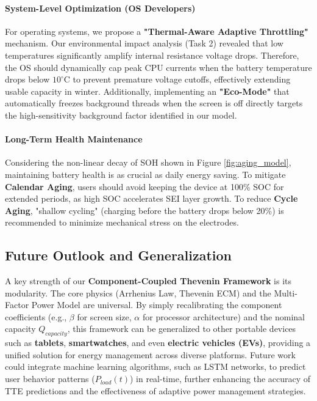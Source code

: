\documentclass{mcmthesis}
\newcommand{\Qcap}{Q_{capacity}}
\begin{document}
\paragraph{System-Level Optimization (OS Developers)}
For operating systems, we propose a \textbf{"Thermal-Aware Adaptive Throttling"} mechanism. Our environmental impact analysis (Task 2) revealed that low temperatures significantly amplify internal resistance voltage drops. Therefore, the OS should dynamically cap peak CPU currents when the battery temperature drops below $10^\circ$C to prevent premature voltage cutoffs, effectively extending usable capacity in winter. Additionally, implementing an \textbf{"Eco-Mode"} that automatically freezes background threads when the screen is off directly targets the high-sensitivity background factor identified in our model.

\paragraph{Long-Term Health Maintenance}
Considering the non-linear decay of SOH shown in Figure \ref{fig:aging_model}, maintaining battery health is as crucial as daily energy saving. To mitigate \textbf{Calendar Aging}, users should avoid keeping the device at 100\% SOC for extended periods, as high SOC accelerates SEI layer growth. To reduce \textbf{Cycle Aging}, "shallow cycling" (charging before the battery drops below 20\%) is recommended to minimize mechanical stress on the electrodes.

\subsection{Future Outlook and Generalization}
A key strength of our \textbf{Component-Coupled Thevenin Framework} is its modularity. The core physics (Arrhenius Law, Thevenin ECM) and the Multi-Factor Power Model are universal. By simply recalibrating the component coefficients (e.g., $\beta$ for screen size, $\alpha$ for processor architecture) and the nominal capacity $\Qcap$, this framework can be generalized to other portable devices such as \textbf{tablets}, \textbf{smartwatches}, and even \textbf{electric vehicles (EVs)}, providing a unified solution for energy management across diverse platforms. Future work could integrate machine learning algorithms, such as LSTM networks, to predict user behavior patterns ($P_{load}(t)$) in real-time, further enhancing the accuracy of TTE predictions and the effectiveness of adaptive power management strategies.
\end{document}
